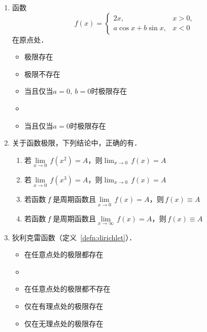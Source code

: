 \begin{enumerate}
\item 函数
  \begin{equation*}
    f(x) =
    \begin{cases}
      2x, & x > 0, \\
      a \cos x + b \sin x, & x < 0
    \end{cases}
  \end{equation*}
  在原点处\uline{\makebox[6em]{}}．
  \begin{itemize}
    \renewcommand{\labelitemi}{\faCircleThin}
  \item 极限存在
  \item 极限不存在
  \item 当且仅当\(a = 0,\ b = 0\)时极限存在
    \ifshowsol
    \item[\faCircle]
    \else
    \item
    \fi
    当且仅当\(a = 0\)时极限存在
  \end{itemize}

\item 关于函数极限，下列结论中，正确的有\uline{}．
  \begin{enumerate}
    \renewcommand{\labelenumii}{\enumparen{\arabic{enumii}}}
  \item 若\(\lim\limits_{x\to0} \,f(x^2) = A\)，则\(\lim_{x\to0} \,f(x) = A\)
  \item 若\(\lim\limits_{x\to0} \,f(x^3) = A\)，则\(\lim_{x\to0} \,f(x) = A\)
  \item 若函数\(\,f\mkern2mu\)是周期函数且\(\lim\limits_{x\to0} \,f(x) = A\)，则\(\,f(x) \equiv A\)
  \item 若函数\(\,f\mkern2mu\)是周期函数且\(\lim\limits_{x\to\infty} \,f(x) = A\)，则\(\,f(x) \equiv A\)
  \end{enumerate}

\item 狄利克雷函数（定义~\ref{defn:dirichlet}）\uline{\makebox[6em]{}}．
  \begin{itemize}
    \renewcommand{\labelitemi}{\faCircleThin}
  \item 在任意点处的极限都存在
    \ifshowsol
    \item[\faCircle]
    \else
    \item
    \fi
    在任意点处的极限都不存在
  \item 仅在有理点处的极限存在
  \item 仅在无理点处的极限存在
  \end{itemize}


\end{enumerate}
